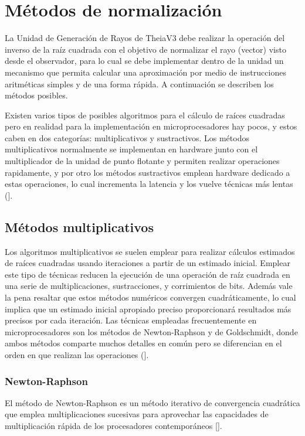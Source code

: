 \section{Métodos de normalización}

La Unidad de Generación de Rayos de TheiaV3 debe realizar la operación del inverso de la raíz cuadrada con el objetivo de normalizar el rayo (vector) visto desde el observador, para lo cual se debe implementar dentro de
la unidad un mecanismo que permita calcular una aproximación por medio de instrucciones aritméticas simples y de una forma rápida.  A continuación se describen los métodos posibles. 

Existen varios tipos de posibles algoritmos para el cálculo de raíces cuadradas pero en realidad para la implementación en microprocesadores hay pocos, y estos caben en dos categorías: multiplicativos y sustractivos. Los métodos multiplicativos normalmente se implementan en hardware junto con el multiplicador de la unidad de punto flotante y permiten realizar operaciones rapidamente, y por otro los métodos sustractivos emplean hardware dedicado a estas operaciones, lo cual incrementa la latencia y los vuelve técnicas más lentas (\cite{Soderquist1997}].   

\subsection{Métodos multiplicativos}

Los algoritmos multiplicativos se suelen emplear para realizar cálculos estimados de raíces cuadradas usando iteraciones a partir de un estimado inicial. Emplear este tipo de técnicas reducen la ejecución de una operación de raíz cuadrada en una serie de multiplicaciones, sustracciones, y corrimientos de bits. Además vale la pena resaltar que estos métodos numéricos convergen cuadráticamente, lo cual implica que un estimado inicial apropiado preciso proporcionará resultados más precisos por cada iteración. Las técnicas empleadas frecuentemente en microprocesadores son los métodos de Newton-Raphson y de Goldschmidt, donde ambos métodos comparte muchos detalles en común pero se diferencian en el orden en que realizan las operaciones (\cite{Soderquist1997}].

\subsubsection{Newton-Raphson}

El método de Newton-Raphson es un método iterativo de convergencia cuadrática que emplea multiplicaciones sucesivas para aprovechar las capacidades de multiplicación rápida de los procesadores contemporáneos [\cite{Schulte1999}]. 

